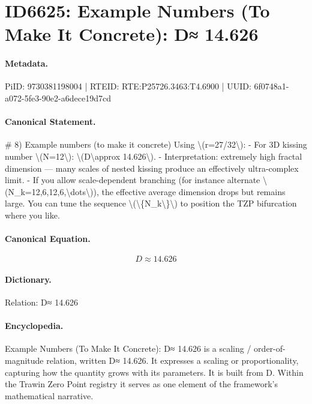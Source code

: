 \section*{ID6625: Example Numbers (To Make It Concrete): D≈ 14.626}
\paragraph{Metadata.}
PiID: 9730381198004 | RTEID: RTE:P25726.3463:T4.6900 | UUID: 6f0748a1-a072-5fe3-90e2-a6dece19d7cd

\paragraph{Canonical Statement.}
\# 8) Example numbers (to make it concrete) Using \textbackslash{}(r=27/32\textbackslash{}): - For 3D kissing number \textbackslash{}(N=12\textbackslash{}): \textbackslash{}(D\textbackslash{}approx 14.626\textbackslash{}). - Interpretation: extremely high fractal dimension — many scales of nested kissing produce an effectively ultra-complex limit. - If you allow scale-dependent branching (for instance alternate \textbackslash{}(N\_k=12,6,12,6,\textbackslash{}dots\textbackslash{})), the effective average dimension drops but remains large. You can tune the sequence \textbackslash{}(\textbackslash{}\{N\_k\textbackslash{}\}\textbackslash{}) to position the TZP bifurcation where you like.

\paragraph{Canonical Equation.}
\[
D\approx 14.626
\]

\paragraph{Dictionary.}
Relation: D≈ 14.626

\paragraph{Encyclopedia.}
Example Numbers (To Make It Concrete): D≈ 14.626 is a scaling / order-of-magnitude relation, written D≈ 14.626. It expresses a scaling or proportionality, capturing how the quantity grows with its parameters. It is built from D. Within the Trawin Zero Point registry it serves as one element of the framework's mathematical narrative.
